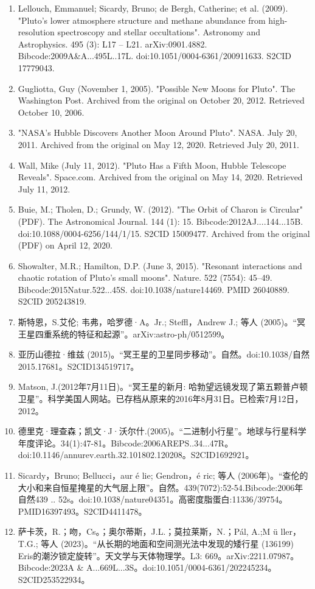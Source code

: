 \begin{enumerate}
\item Lellouch, Emmanuel; Sicardy, Bruno; de Bergh, Catherine; et al. (2009). "Pluto's lower atmosphere structure and methane abundance from high-resolution spectroscopy and stellar occultations". Astronomy and Astrophysics. 495 (3): L17 – L21. arXiv:0901.4882. Bibcode:2009A&A...495L..17L. doi:10.1051/0004-6361/200911633. S2CID 17779043.
\item Gugliotta, Guy (November 1, 2005). "Possible New Moons for Pluto". The Washington Post. Archived from the original on October 20, 2012. Retrieved October 10, 2006.
\item "NASA's Hubble Discovers Another Moon Around Pluto". NASA. July 20, 2011. Archived from the original on May 12, 2020. Retrieved July 20, 2011.
\item Wall, Mike (July 11, 2012). "Pluto Has a Fifth Moon, Hubble Telescope Reveals". Space.com. Archived from the original on May 14, 2020. Retrieved July 11, 2012.
\item Buie, M.; Tholen, D.; Grundy, W. (2012). "The Orbit of Charon is Circular" (PDF). The Astronomical Journal. 144 (1): 15. Bibcode:2012AJ....144...15B. doi:10.1088/0004-6256/144/1/15. S2CID 15009477. Archived from the original (PDF) on April 12, 2020.
\item Showalter, M.R.; Hamilton, D.P. (June 3, 2015). "Resonant interactions and chaotic rotation of Pluto's small moons". Nature. 522 (7554): 45–49. Bibcode:2015Natur.522...45S. doi:10.1038/nature14469. PMID 26040889. S2CID 205243819.
\item 斯特恩，S.艾伦; 韦弗，哈罗德·A。Jr.; Steffl，Andrew J.; 等人 (2005)。“冥王星四重系统的特征和起源”。arXiv:astro-ph/0512599。
\item 亚历山德拉·维兹 (2015)。“冥王星的卫星同步移动”。自然。doi:10.1038/自然2015.17681。S2CID134519717。 
\item Matson, J.(2012年7月11日)。“冥王星的新月: 哈勃望远镜发现了第五颗普卢顿卫星”。科学美国人网站。已存档从原来的2016年8月31日。已检索7月12日，2012。
\item 德里克·理查森；凯文·J·沃尔什.(2005)。“二进制小行星”。地球与行星科学年度评论。34(1):47-81。Bibcode:2006AREPS..34...47R。doi:10.1146/annurev.earth.32.101802.120208。S2CID1692921。 
\item Sicardy，Bruno; Bellucci，aur é lie; Gendron，é ric; 等人 (2006年)。“查伦的大小和来自恒星掩星的大气层上限”。自然。439(7072):52-54.Bibcode:2006年自然439 .. 52s。doi:10.1038/nature04351。高密度脂蛋白:11336/39754。PMID16397493。S2CID4411478。  
\item 萨卡茨，R.；吻，Cs。；奥尔蒂斯，J.L.；莫拉莱斯，N.；Pál, A.;M ü ller，T.G.; 等人 (2023)。“从长期的地面和空间测光法中发现的矮行星 (136199) Eris的潮汐锁定旋转”。天文学与天体物理学。L3: 669。arXiv:2211.07987。Bibcode:2023A & A...669L...3S。doi:10.1051/0004-6361/202245234。S2CID253522934。 

\end{enumerate}

